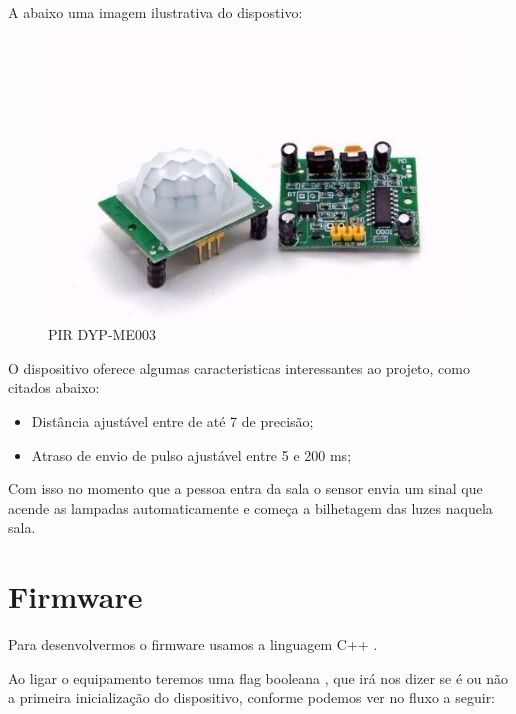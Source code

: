 \documentclass[openright]{normas-utf-tex} %
\begin{document}
A abaixo uma imagem ilustrativa do dispostivo:
\begin{figure}[!htb]
     \centering
     \includegraphics[scale=0.6]{PIR.jpg}
     \caption{PIR DYP-ME003}
     \label{fig:PIR DYP-ME003}
\end{figure}

O dispositivo oferece algumas caracteristicas interessantes ao projeto, como citados abaixo:

\begin{itemize}
    \item Distância ajustável entre de até 7 de precisão;
    \item Atraso de envio de pulso ajustável entre 5 e 200 ms;
\end{itemize}

Com isso no momento que a pessoa entra da sala o sensor envia um sinal que acende as lampadas automaticamente e começa a bilhetagem das luzes naquela sala.


\section{Firmware}

Para desenvolvermos o firmware usamos a linguagem C++ \cite{Altabooks}. 

Ao ligar o equipamento teremos uma flag booleana \cite{Elsevier}, que irá nos dizer se é ou não a primeira inicialização do dispositivo, conforme podemos ver no fluxo a seguir:
\end{document}
